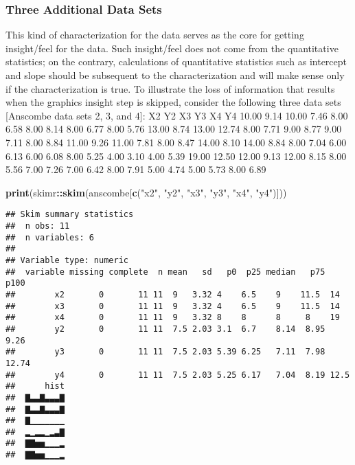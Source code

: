 \documentclass[]{book}
\newenvironment{Shaded}{\begin{snugshade}}{\end{snugshade}}
\newcommand{\KeywordTok}[1]{\textcolor[rgb]{0.13,0.29,0.53}{\textbf{#1}}}
\newcommand{\StringTok}[1]{\textcolor[rgb]{0.31,0.60,0.02}{#1}}
\newcommand{\OperatorTok}[1]{\textcolor[rgb]{0.81,0.36,0.00}{\textbf{#1}}}
\newcommand{\NormalTok}[1]{#1}
\theoremstyle{definition}
\theoremstyle{definition}
\theoremstyle{definition}
\theoremstyle{remark}
\begin{document}
\subsubsection{Three Additional Data
Sets}\label{three-additional-data-sets}

This kind of characterization for the data serves as the core for
getting insight/feel for the data. Such insight/feel does not come from
the quantitative statistics; on the contrary, calculations of
quantitative statistics such as intercept and slope should be subsequent
to the characterization and will make sense only if the characterization
is true. To illustrate the loss of information that results when the
graphics insight step is skipped, consider the following three data sets
{[}Anscombe data sets 2, 3, and 4{]}: X2 Y2 X3 Y3 X4 Y4 10.00 9.14 10.00
7.46 8.00 6.58 8.00 8.14 8.00 6.77 8.00 5.76 13.00 8.74 13.00 12.74 8.00
7.71 9.00 8.77 9.00 7.11 8.00 8.84 11.00 9.26 11.00 7.81 8.00 8.47 14.00
8.10 14.00 8.84 8.00 7.04 6.00 6.13 6.00 6.08 8.00 5.25 4.00 3.10 4.00
5.39 19.00 12.50 12.00 9.13 12.00 8.15 8.00 5.56 7.00 7.26 7.00 6.42
8.00 7.91 5.00 4.74 5.00 5.73 8.00 6.89

\begin{Shaded}
\begin{Highlighting}[]
\KeywordTok{print}\NormalTok{(skimr}\OperatorTok{::}\KeywordTok{skim}\NormalTok{(anscombe[}\KeywordTok{c}\NormalTok{(}\StringTok{"x2"}\NormalTok{, }\StringTok{"y2"}\NormalTok{, }\StringTok{"x3"}\NormalTok{, }\StringTok{"y3"}\NormalTok{, }\StringTok{"x4"}\NormalTok{, }\StringTok{"y4"}\NormalTok{)]))}
\end{Highlighting}
\end{Shaded}

\begin{verbatim}
## Skim summary statistics
##  n obs: 11 
##  n variables: 6 
## 
## Variable type: numeric 
##  variable missing complete  n mean   sd   p0  p25 median   p75  p100
##        x2       0       11 11  9   3.32 4    6.5    9    11.5  14   
##        x3       0       11 11  9   3.32 4    6.5    9    11.5  14   
##        x4       0       11 11  9   3.32 8    8      8     8    19   
##        y2       0       11 11  7.5 2.03 3.1  6.7    8.14  8.95  9.26
##        y3       0       11 11  7.5 2.03 5.39 6.25   7.11  7.98 12.74
##        y4       0       11 11  7.5 2.03 5.25 6.17   7.04  8.19 12.5 
##      hist
##  ▇▃▃▇▃▃▃▇
##  ▇▃▃▇▃▃▃▇
##  ▇▁▁▁▁▁▁▁
##  ▂▁▂▂▁▂▃▇
##  ▇▇▅▅▁▁▁▂
##  ▇▇▅▅▁▁▁▂
\end{verbatim}
\end{document}
